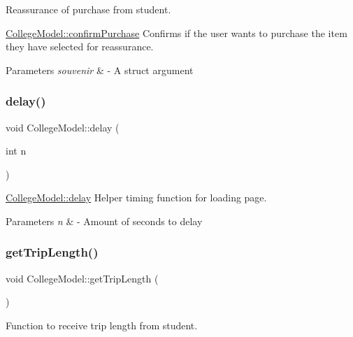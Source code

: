 Reassurance of purchase from student. 

\mbox{\hyperlink{class_college_model_a0bf105af39d44c58b7acfc4600f739cf}{College\+Model\+::confirm\+Purchase}} Confirms if the user wants to purchase the item they have selected for reassurance.


\begin{DoxyParams}{Parameters}
{\em souvenir} & -\/ A struct argument \\
\hline
\end{DoxyParams}
\mbox{\label{class_college_model_aec2e897e1a9e275308ed7889b7d94ef1}} 
\subsubsection{\texorpdfstring{delay()}{delay()}}
{\footnotesize\ttfamily void College\+Model\+::delay (\begin{DoxyParamCaption}\item[{int}]{n }\end{DoxyParamCaption})}



\mbox{\hyperlink{class_college_model_aec2e897e1a9e275308ed7889b7d94ef1}{College\+Model\+::delay}} Helper timing function for loading page. 


\begin{DoxyParams}{Parameters}
{\em n} & -\/ Amount of seconds to delay \\
\hline
\end{DoxyParams}
\mbox{\label{class_college_model_ab621eb530418fdcbd35a88911881504f}} 
\subsubsection{\texorpdfstring{get\+Trip\+Length()}{getTripLength()}}
{\footnotesize\ttfamily void College\+Model\+::get\+Trip\+Length (\begin{DoxyParamCaption}{ }\end{DoxyParamCaption})}



Function to receive trip length from student. 

